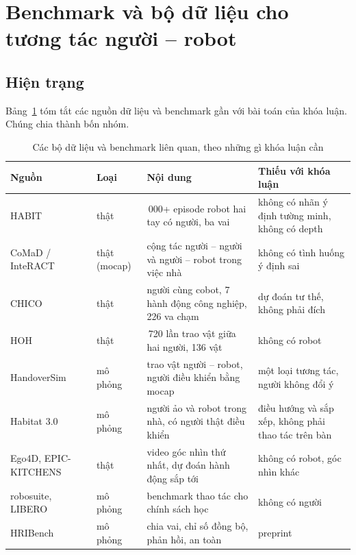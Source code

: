 \section{Benchmark và bộ dữ liệu cho tương tác người -- robot}
\label{sec:bg-benchmark}

\subsection{Hiện trạng}

Bảng~\ref{tab:bg-datasets} tóm tắt các nguồn dữ liệu và benchmark gần với bài toán của khóa luận. Chúng chia thành bốn nhóm.

\begin{table}[H]
  \centering
  \caption{Các bộ dữ liệu và benchmark liên quan, theo những gì khóa luận cần}
  \label{tab:bg-datasets}
  \small
  \begin{tabularx}{\textwidth}{@{}>{\raggedright\arraybackslash}p{2.9cm}>{\raggedright\arraybackslash}p{1.5cm}>{\raggedright\arraybackslash}X>{\raggedright\arraybackslash}p{3.4cm}@{}}
    \toprule
    Nguồn & Loại & Nội dung & Thiếu với khóa luận \\
    \midrule
    HABIT~\cite{song2026habit} & thật & 10\,000+ episode robot hai tay có người, ba vai & không có nhãn ý định tường minh, không có depth \\
    CoMaD / InteRACT~\cite{kedia2024interact} & thật (mocap) & cộng tác người -- người và người -- robot trong việc nhà & không có tình huống ý định sai \\
    CHICO~\cite{sampieri2022chico} & thật & 20 người cùng cobot, 7 hành động công nghiệp, 226 va chạm & dự đoán tư thế, không phải đích \\
    HOH~\cite{wiederhold2023hoh} & thật & 2\,720 lần trao vật giữa hai người, 136 vật & không có robot \\
    HandoverSim~\cite{chao2022handoversim} & mô phỏng & trao vật người -- robot, người điều khiển bằng mocap & một loại tương tác, người không đổi ý \\
    Habitat 3.0~\cite{puig2024habitat3} & mô phỏng & người ảo và robot trong nhà, có người thật điều khiển & điều hướng và sắp xếp, không phải thao tác trên bàn \\
    Ego4D, EPIC-KITCHENS~\cite{grauman2022ego4d,damen2022epic} & thật & video góc nhìn thứ nhất, dự đoán hành động sắp tới & không có robot, góc nhìn khác \\
    robosuite, LIBERO~\cite{zhu2020robosuite,liu2023libero} & mô phỏng & benchmark thao tác cho chính sách học & không có người \\
    HRIBench~\cite{liu2026hribench} & mô phỏng & chia vai, chỉ số đồng bộ, phản hồi, an toàn & preprint \\
    \bottomrule
  \end{tabularx}
\end{table}

